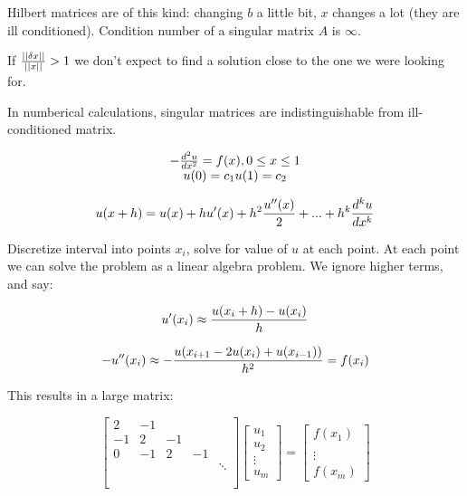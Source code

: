 Hilbert matrices are of this kind: changing $b$ a little bit, $x$ changes a lot (they are ill conditioned). Condition number of a singular matrix $A$ is $\infty$.

If ${\left|\left|\delta x\right|\right| \over \left|\left|x\right|\right|} > 1$ we don't expect to find a solution close to the one we were looking for.

In numberical calculations, singular matrices are indistinguishable from ill-conditioned matrix.


\[
	\begin{matrix}
		-{d^2 u \over dx^2} = f(x), 0 \leq x \leq 1 \\
		u(0) = c_1
		u(1) = c_2
	\end{matrix}
\]

\[
	u(x+h) = u(x) + h u'(x) + h^2 {u''(x) \over 2} + ... + h^k {d^k u \over d x^k}
\]

Discretize interval into points $x_i$, solve for value of $u$ at each point. At each point we can solve the problem as a linear algebra problem. We ignore higher terms, and say:

\[
	u'(x_i) \approx {u(x_i+h) - u(x_i) \over h}
\]

\[
	-u''(x_i) \approx -{u(x_{i+1} - 2 u(x_i) + u(x_{i-1})) \over h^2 } = f(x_i)
\]

This results in a large matrix:

\[
	\begin{bmatrix}
		2 & -1 \\
		-1 & 2 & -1 \\
		0 & -1 & 2 & -1 \\
		 & & & & \ddots \\ \\ \\
	\end{bmatrix}
	\begin{bmatrix}
		u_1 \\ u_2 \\ \vdots \\ u_m
	\end{bmatrix}
	=
	\begin{bmatrix}
		f(x_1) \\ \\ \vdots \\ f(x_m)
	\end{bmatrix}
\]